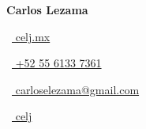 \begin{large}
	\textbf{Carlos Lezama}
\end{large}

\vspace*{0.25em}

\begin{footnotesize}
	\begin{tiny}\faMousePointer\end{tiny}~\href{https://celj.mx/}{
		celj.mx
	}
	\quad\begin{tiny}\faMobile*\end{tiny}~\href{tel:+525561337361}{
		+52 55 6133 7361
	}
	\quad \begin{tiny}\faEnvelope[regular]\end{tiny}~\href{mailto:carloselezama@gmail.com}{
		carloselezama@gmail.com
	}
	\quad\begin{tiny}\faGithub\end{tiny}~\href{https://github.com/celj/}{
		celj
	}
\end{footnotesize}